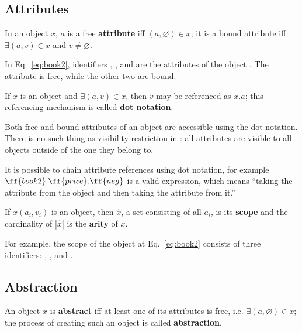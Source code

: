 \subsection{Attributes}

\begin{eodefinition}\label{def:attribute}
In an object $x$, $a$ is a free \textbf{attribute}
iff $(a, \varnothing) \in x$; it is a bound attribute
iff $\exists (a, v)\in x$ and $v\not=\varnothing$.
\end{eodefinition}

In Eq.~\ref{eq:book2}, identifiers , , and 
are the attributes of the object .
The attribute  is free, while the other two are bound.

\begin{eodefinition}\label{def:dot}
If $x$ is an object and $\exists (a, v) \in x$, then $v$ may be referenced as $x.a$;
this referencing mechanism is called \textbf{dot notation}.
\end{eodefinition}

Both free and bound attributes of an object are accessible using
the dot notation. There is no such thing as
visibility restriction in \phic{}:
all attributes are visible to all objects outside of the one they belong to.

It is possible to chain attribute references using dot notation, for example
$\ff{book2}.\ff{price}.\ff{neg}$ is a valid expression, which means
``taking the attribute  from the object  and then
taking the attribute  from it.''

\begin{eodefinition}\label{def:scope}
If $x(a_i, v_i)$ is an object, then $\hat{x}$, a set consisting of all $a_i$,
is its \textbf{scope} and the cardinality of $|\hat{x}|$ is
the \textbf{arity} of $x$.
\end{eodefinition}

For example, the scope of the object at Eq.~\ref{eq:book2} consists of three identifiers:
, , and .

\subsection{Abstraction}

\begin{eodefinition}\label{def:abstraction}
An object $x$ is \textbf{abstract} iff at least one of its attributes is free,
i.e. $\exists (a, \varnothing)\in x$;
the process of creating such an object is called \textbf{abstraction}.
\end{eodefinition}

